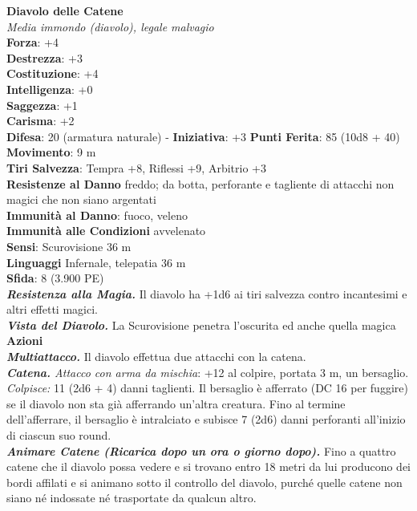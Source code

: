 \begin{multicols}{2}
\medskip\textbf{Diavolo delle Catene}\\
\emph{Media immondo (diavolo), legale malvagio}\\
\textbf{Forza}: +4\\
\textbf{Destrezza}: +3\\
\textbf{Costituzione}: +4\\
\textbf{Intelligenza}: +0\\
\textbf{Saggezza}: +1\\
\textbf{Carisma}: +2\\
\textbf{Difesa}: 20 (armatura naturale) - \textbf{Iniziativa}: +3
\textbf{Punti Ferita}: 85 (10d8 + 40)\\
\textbf{Movimento}: 9 m\\
\textbf{Tiri Salvezza}: Tempra +8, Riflessi +9, Arbitrio +3\\
\textbf{Resistenze al Danno} freddo; da botta, perforante e tagliente di attacchi non magici che non siano argentati\\
\textbf{Immunità al Danno}: fuoco, veleno\\
\textbf{Immunità alle Condizioni} avvelenato\\
\textbf{Sensi}: Scurovisione 36 m\\
\textbf{Linguaggi} Infernale, telepatia 36 m \\
\textbf{Sfida}: 8 (3.900 PE)\smallskip\\
\emph{\textbf{Resistenza alla Magia.}} Il diavolo ha +1d6 ai tiri salvezza contro incantesimi e altri effetti magici.\\
\emph{\textbf{Vista del Diavolo.}} La Scurovisione penetra l'oscurita ed anche quella magica\\
\smallskip\textbf{Azioni}\\
\emph{\textbf{Multiattacco.}} Il diavolo effettua due attacchi con la catena.\\
\emph{\textbf{Catena.} Attacco con arma da mischia}: +12 al colpire, portata 3 m, un bersaglio.\\
\emph{Colpisce:} 11 (2d6 + 4) danni taglienti. Il bersaglio è afferrato (DC  16 per fuggire) se il diavolo non sta già afferrando un'altra creatura. Fino al termine dell'afferrare, il bersaglio è intralciato e subisce 7 (2d6) danni perforanti all'inizio di ciascun suo round.\\
\emph{\textbf{Animare Catene (Ricarica dopo un ora o giorno dopo).}} Fino a quattro catene che il diavolo possa vedere e si trovano entro 18 metri da lui producono dei bordi affilati e si animano sotto il controllo del diavolo, purché quelle catene non siano né indossate né trasportate da qualcun altro.\\

\end{multicols}
